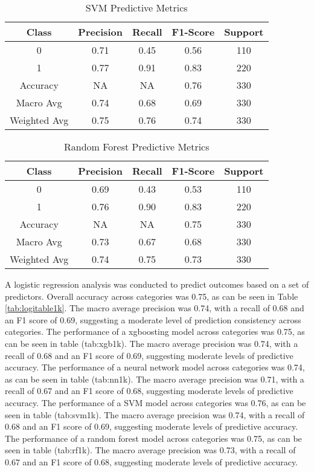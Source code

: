 \documentclass[
  man]{apa7}
\begin{document}
\begin{table}
\centering
\caption{\label{tab:svm1k}SVM Predictive Metrics}
\centering
\fontsize{12}{14}\selectfont
\begin{tabular}[t]{c|c|c|c|c}
\hline
Class & Precision & Recall & F1-Score & Support\\
\hline
0 & 0.71 & 0.45 & 0.56 & 110\\
\hline
1 & 0.77 & 0.91 & 0.83 & 220\\
\hline
Accuracy & NA & NA & 0.76 & 330\\
\hline
Macro Avg & 0.74 & 0.68 & 0.69 & 330\\
\hline
Weighted Avg & 0.75 & 0.76 & 0.74 & 330\\
\hline
\end{tabular}
\end{table}

\begin{table}
\centering
\caption{\label{tab:rf1k}Random Forest Predictive Metrics}
\centering
\fontsize{12}{14}\selectfont
\begin{tabular}[t]{c|c|c|c|c}
\hline
Class & Precision & Recall & F1-Score & Support\\
\hline
0 & 0.69 & 0.43 & 0.53 & 110\\
\hline
1 & 0.76 & 0.90 & 0.83 & 220\\
\hline
Accuracy & NA & NA & 0.75 & 330\\
\hline
Macro Avg & 0.73 & 0.67 & 0.68 & 330\\
\hline
Weighted Avg & 0.74 & 0.75 & 0.73 & 330\\
\hline
\end{tabular}
\end{table}

A logistic regression analysis was conducted to predict outcomes based on a set of predictors. Overall accuracy across categories was 0.75, as can be seen in Table \ref{tab:logitable1k}. The macro average precision was 0.74, with a recall of 0.68 and an F1 score of 0.69, suggesting a moderate level of prediction consistency across categories.
The performance of a xgboosting model across categories was 0.75, as can be seen in table (tab:xgb1k). The macro average precision was 0.74, with a recall of 0.68 and an F1 score of 0.69, suggesting moderate levels of predictive accuracy.
The performance of a neural network model across categories was 0.74, as can be seen in table (tab:nn1k). The macro average precision was 0.71, with a recall of 0.67 and an F1 score of 0.68, suggesting moderate levels of predictive accuracy.
The performance of a SVM model across categories was 0.76, as can be seen in table (tab:svm1k). The macro average precision was 0.74, with a recall of 0.68 and an F1 score of 0.69, suggesting moderate levels of predictive accuracy.
The performance of a random forest model across categories was 0.75, as can be seen in table (tab:rf1k). The macro average precision was 0.73, with a recall of 0.67 and an F1 score of 0.68, suggesting moderate levels of predictive accuracy.
\end{document}
